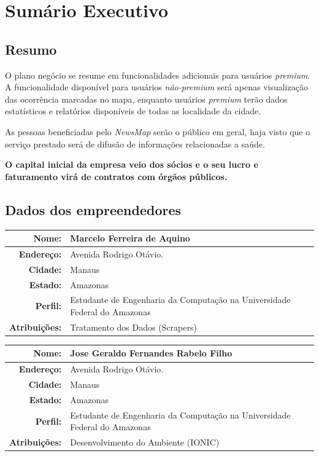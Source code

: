 \documentclass[
	12pt,				%
	openright,			%
	twoside,			%
	a4paper,			%
	english,			%
	french,				%
	spanish,			%
	brazil,				%
	]{abntex2}
\begin{document}
\chapter{Sumário Executivo}


\section{Resumo}

O plano negócio se resume em funcionalidades adicionais para usuários \textit{premium}. A funcionalidade disponível para usuários \textit{não-premium} será apenas visualização das ocorrência marcadas no mapa, enquanto usuários \textit{premium} terão dados  estatísticos e relatórios disponíveis de todas as localidade da cidade.

As pessoas beneficiadas pelo \textit{NewsMap} serão o público em geral, haja visto que o serviço prestado será de difusão de informações relacionadas a saúde. 

\textbf{O capital inicial da empresa veio dos sócios e o seu lucro e faturamento virá de contratos com órgãos públicos.}


\section{Dados dos empreendedores}

\begin{center}
	\begin{tabular}{|r|p{12cm}|}
		\hline
		\textbf{Nome:}		& Marcelo Ferreira de Aquino \\ \hline
		\textbf{Endereço:}	& Avenida Rodrigo Otávio. \\ \hline
		\textbf{Cidade:}	& Manaus \\ \hline
		\textbf{Estado:}	& Amazonas \\ \hline
		\textbf{Perfil:}	& Estudante de Engenharia da Computação na Universidade Federal do Amazonas\\ \hline
		\textbf{Atribuições:}	& Tratamento dos Dados (Scrapers) \\ \hline
	\end{tabular}
\end{center}

\begin{center}
	\begin{tabular}{|r|p{12cm}|}
		\hline
		\textbf{Nome:}		& Jose Geraldo Fernandes Rabelo Filho \\ \hline
		\textbf{Endereço:}	& Avenida Rodrigo Otávio. \\ \hline
		\textbf{Cidade:}	& Manaus \\ \hline
		\textbf{Estado:}	& Amazonas \\ \hline
		\textbf{Perfil:}	& Estudante de Engenharia da Computação na Universidade Federal do Amazonas\\ \hline
		\textbf{Atribuições:}	& Desenvolvimento do Ambiente (IONIC) \\ \hline
	\end{tabular}
\end{center}
\end{document}

